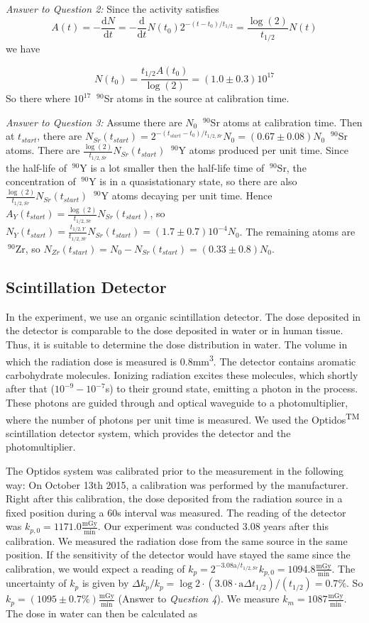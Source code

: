 \documentclass[a4paper,parskip]{scrartcl}
\begin{document}
\textit{Answer to Question 2:} Since the activity satisfies 
$$A(t) = -\frac{\mathrm{d}N}{\mathrm{d}t} = -\frac{\mathrm{d}}{\mathrm{d}t}N(t_0)2^{-(t-t_{0})/t_{1/2}} = \frac{\log(2)}{t_{1/2}}N(t)$$
we have

$$N(t_0) = \frac{t_{1/2}A(t_0)}{\log(2)} = (1.0 \pm 0.3)10^{17}$$
So there where $10^{17}$ $~^{90}$Sr atoms in the source at calibration time.

\textit{Answer to Question 3:} Assume there are $N_0$ $~^{90}$Sr atoms at calibration time. Then at $t_{start}$, there are $N_{Sr}(t_{start}) = 2^{-(t_{start}-t_{0})/t_{1/2,Sr}}N_0 = (0.67 \pm 0.08)N_0$ $~^{90}$Sr atoms. There are $\frac{\log(2)}{t_{1/2,Sr}}N_{Sr}(t_{start})$ $~^{90}$Y atoms produced per unit time. Since the half-life of $~^{90}$Y is a lot smaller then the half-life time of $~^{90}$Sr, the concentration of $~^{90}$Y is in a quasistationary state, so there are also $\frac{\log(2)}{t_{1/2,Sr}}N_{Sr}(t_{start})$ $~^{90}$Y atoms decaying per unit time. Hence $A_{Y}(t_{start}) = \frac{\log(2)}{t_{1/2,Sr}}N_{Sr}(t_{start})$, so $N_Y(t_{start})=\frac{t_{1/2,Y}}{t_{1/2,Sr}}N_{Sr}(t_{start}) = (1.7 \pm 0.7)10^{-4}N_0$. The remaining atoms are $~^{90}$Zr, so $N_{Zr}(t_{start})=N_0-N_{Sr}(t_{start})=(0.33 \pm 0.8)N_0$.

\subsection{Scintillation Detector}
In the experiment, we use an organic scintillation detector. The dose deposited in the detector is comparable to the dose deposited in water or in human tissue. Thus, it is suitable to determine the dose distribution in water. The volume in which the radiation dose is measured is 0.8mm\textsuperscript{3}. The detector contains aromatic carbohydrate molecules. Ionizing radiation excites these molecules, which shortly after that ($10^{-9}-10^{-7}$s) to their ground state, emitting a photon in the process. These photons are guided through and optical waveguide to a photomultiplier, where the number of photons per unit time is measured. We used the Optidos\textsuperscript{TM} scintillation detector system, which provides the detector and the photomultiplier.    

The Optidos system was calibrated prior to the measurement in the following way: On October 13th 2015, a calibration was performed by the manufacturer. Right after this calibration, the dose deposited from the radiation source in a fixed position during a 60s interval was measured. The reading of the detector was $k_{p,0}=1171.0\frac{\mathrm{mGy}}{\mathrm{min}}$. Our experiment was conducted $3.08$ years after this calibration. We measured the radiation dose from the same source in the same position. If the sensitivity of the detector would have stayed the same since the calibration, we would expect a reading of $k_p = 2^{-3.08\mathrm{a}/t_{1/2,Sr}}k_{p,0}=1094.8\frac{\mathrm{mGy}}{\mathrm{min}}$. The uncertainty of $k_p$ is given by $\Delta k_p/k_p = \log 2 \cdot (3.08 \cdot \mathrm{a} \Delta t_{1/2})/(t_{1/2}) = 0.7\%$. So $k_p = (1095 \pm 0.7\%)\frac{\mathrm{mGy}}{\mathrm{min}}$ (Answer to \textit{Question 4}). We measure $k_m = 1087\frac{\mathrm{mGy}}{\mathrm{min}}$. The dose in water can then be calculated as 
\end{document}
